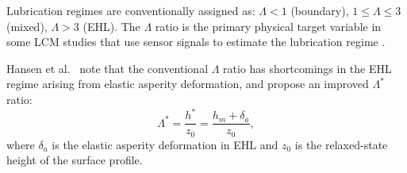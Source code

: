Lubrication regimes are conventionally assigned as: $\Lambda < 1$ (boundary), $1 \leq \Lambda \leq 3$ (mixed), $\Lambda > 3$ (EHL). The $\Lambda$ ratio is the primary physical target variable in some LCM studies that use sensor signals to estimate the lubrication regime \cite{jakobsen_detecting_2023,hou_-situ_2025,cornel_condition_2021}.

Hansen et al.\ \cite{hansen_new_2021} note that the conventional $\Lambda$ ratio has shortcomings in the EHL regime arising from elastic asperity deformation, and propose an improved $\Lambda^*$ ratio:
\begin{equation}
\Lambda^* = \frac{h^*}{z_0} = \frac{h_m+\delta_a}{z_0},
\end{equation}
where $\delta_a$ is the elastic asperity deformation in EHL and $z_0$ is the relaxed-state height of the surface profile.


